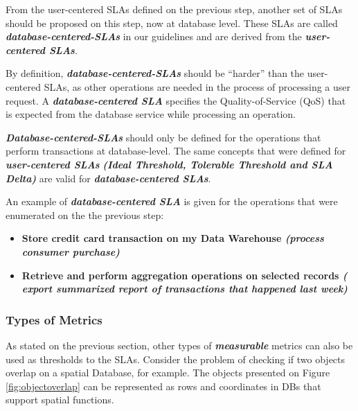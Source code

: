 From the user-centered SLAs defined on the previous step, another set of SLAs should be proposed on this step, now at database level. These SLAs are called \textbf{\textit{database-centered-SLAs}} in our guidelines and are derived from the \textbf{\textit{user-centered SLAs}}.

By definition, \textbf{\textit{database-centered-SLAs}} should be ``harder'' than the user-centered SLAs, as other operations are needed in the process of processing a user request. A \textbf{\textit{database-centered SLA}} specifies the Quality-of-Service (QoS) that is expected from the database service while processing an operation.

\textbf{ \textit{Database-centered-SLAs}} should only be defined for the operations that perform transactions at database-level. The same concepts that were defined for \textbf{\textit{user-centered SLAs}} \textbf{\textit{(Ideal Threshold, Tolerable Threshold and SLA Delta)}} are valid for \textbf{\textit{database-centered SLAs}}.

An example of \textbf{\textit{database-centered SLA}} is given for the operations that were enumerated on the the previous step: 

\begin{itemize}
\item{ 
\textbf{Store credit card transaction on my Data Warehouse \textit{(process consumer purchase)}}
}

\item{
\textbf{Retrieve and perform aggregation operations on selected records \textit{( export summarized report of transactions that happened last week)}}
}
\end{itemize}

\subsubsection{Types of Metrics} 
\label{typesOfMetrics}
As stated on the previous section, other types of \textbf{\textit{measurable}} metrics can also be used as thresholds to the SLAs. Consider the problem of checking if two objects overlap on a spatial Database, for example. The objects presented on Figure \ref{fig:objectoverlap} can be represented as rows and coordinates in DBs that support spatial functions. 

